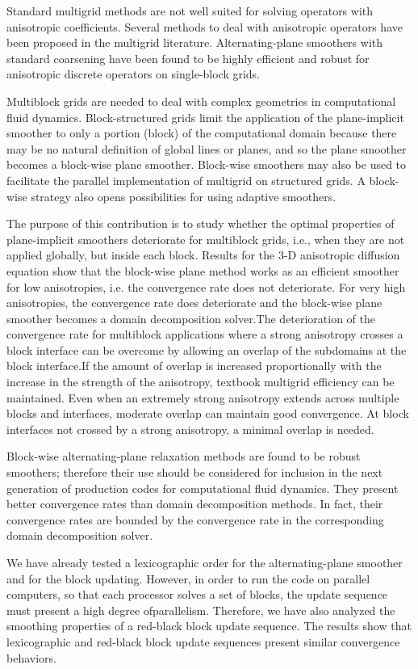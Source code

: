 \documentclass[11pt]{article}
\begin{document}
Standard multigrid methods are not well suited for solving
operators with anisotropic coefficients.
Several methods to deal with anisotropic
operators have been proposed in the multigrid literature. Alternating-plane
smoothers with standard coarsening have been found to be highly efficient
and robust for anisotropic discrete operators on single-block grids.

Multiblock grids are needed to deal with complex geometries
in computational fluid dynamics. Block-structured grids limit the application
of the plane-implicit smoother to only a portion (block) of the computational
domain because there may be no natural definition of global lines or planes,
and so the plane smoother becomes a block-wise plane smoother. Block-wise
smoothers may also be used to facilitate the parallel implementation of
multigrid on structured grids. A block-wise strategy also opens possibilities
for using adaptive smoothers.

The purpose of this contribution is to study whether the
optimal properties of plane-implicit smoothers deteriorate for multiblock
grids, i.e., when they are not applied globally, but inside each block.
Results for the 3-D anisotropic diffusion equation show that the block-wise
plane method works as an efficient smoother for low anisotropies, i.e.
the convergence rate does not deteriorate. For very high anisotropies,
the convergence rate does deteriorate and the block-wise plane smoother
becomes a domain decomposition solver.The deterioration of the convergence
rate for multiblock applications where a strong anisotropy crosses a block
interface can be overcome by allowing an overlap of the subdomains at the
block interface.If the amount of overlap is increased proportionally with
the increase in the strength of the anisotropy, textbook multigrid efficiency
can be maintained. Even when an extremely strong anisotropy extends across
multiple blocks and interfaces, moderate overlap can maintain good convergence.
At block interfaces not crossed by a strong anisotropy, a minimal overlap
is needed.

Block-wise alternating-plane relaxation methods are found
to be robust smoothers; therefore their use should be considered for inclusion
in the next generation of production codes for computational fluid dynamics.
They present better convergence rates than domain decomposition methods.
In fact, their convergence rates are bounded by the convergence rate in
the corresponding domain decomposition solver.

We have already tested a lexicographic order for the alternating-plane
smoother and for the block updating. However, in order to run the code
on parallel computers, so that each processor solves a set of blocks, the
update sequence must present a high degree ofparallelism. Therefore, we
have also analyzed the smoothing properties of a red-black block update
sequence. The results show that lexicographic and red-black block update
sequences present similar convergence behaviors.
\end{document}
